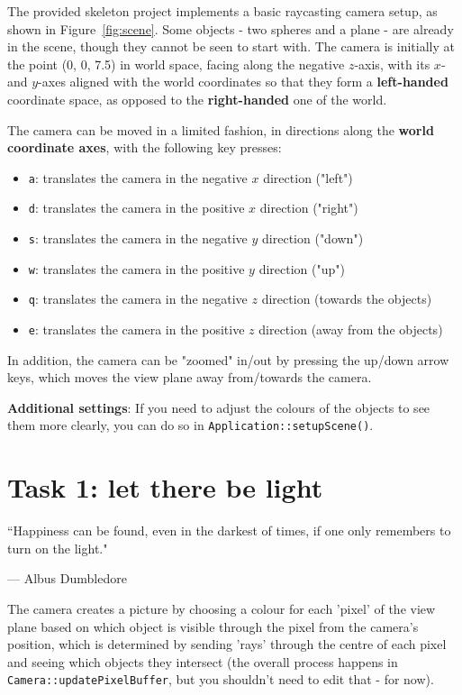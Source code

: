 \documentclass{../../../fal_assignment}
\begin{document}
The provided skeleton project implements a basic raycasting camera setup, as shown in Figure~\ref{fig:scene}.
Some objects - two spheres and a plane - are already in the scene, though they cannot be seen to start with. The camera is initially at the point (0, 0, 7.5) in world space, facing along the negative $z$-axis, with its $x$- and $y$-axes aligned with the world coordinates so that they form a \textbf{left-handed} coordinate space, as opposed to the \textbf{right-handed} one of the world.

The camera can be moved in a limited fashion, in directions along the \textbf{world coordinate axes}, with the following key presses:

\begin{itemize}
	\item \lstinline{a}: translates the camera in the negative $x$ direction ("left")
	\item \lstinline{d}: translates the camera in the positive $x$ direction ("right")
	\item \lstinline{s}: translates the camera in the negative $y$ direction ("down")
	\item \lstinline{w}: translates the camera in the positive $y$ direction ("up")
	\item \lstinline{q}:  translates the camera in the negative $z$ direction (towards the objects)
	\item \lstinline{e}:  translates the camera in the positive $z$ direction (away from the objects)
\end{itemize}

In addition, the camera can be "zoomed" in/out by pressing the up/down arrow keys, which moves the view plane away from/towards the camera.

\textbf{Additional settings}: If you need to adjust the colours of the objects to see them more clearly, you can do so in \lstinline{Application::setupScene()}.

\section*{Task 1: let there be light}
\begin{marginquote}
``Happiness can be found, even in the darkest of times, if one only remembers to turn on the light."
\par --- Albus Dumbledore
\end{marginquote}
The camera creates a picture by choosing a colour for each 'pixel' of the view plane based on which object is visible through the pixel from the camera's position, which is determined by sending 'rays' through the centre of each pixel and seeing which objects they intersect (the overall process happens in \lstinline{Camera::updatePixelBuffer}, but you shouldn't need to edit that - for now).
\end{document}
